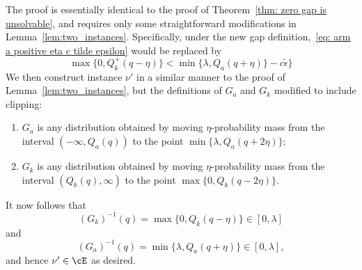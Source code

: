   The proof is essentially identical to the proof of Theorem~\ref{thm: zero gap is unsolvable}, and requires only some straightforward modifications in Lemma~\ref{lem:two_instances}. Specifically, under the new gap definition,~\eqref{eq: arm a positive eta c tilde epsilon} would be replaced by
     \begin{equation}
          \max\{0, Q^+_{k}(q - \eta)\}
       <
        \min\{\lambda, Q_{a}(q + \eta)\} - c \tilde{\epsilon}
        \Big\}
     \end{equation}
    We then construct instance $\nu'$ in a similar manner to the proof of Lemma~\ref{lem:two_instances}, but the definitions of $G_a$ and $G_k$ modified to include clipping:
    \begin{enumerate}[topsep=0pt, itemsep=0pt]
        \item 
        $G_a$ is any distribution obtained by moving $\eta$-probability mass from the interval $(-\infty, Q_a(q))$ to the point $\min\{\lambda, Q_{a}(q + 2\eta)\}$;
    
        \item 
        $G_k$ is any distribution obtained by moving $\eta$-probability mass from the interval $(Q_k(q), \infty)$ to the point $\max\{0, Q_{k}(q - 2\eta)\}$.    
    \end{enumerate}     
    It now follows that
     \begin{equation}
         (G_k)^{-1}(q) = \max\{0, Q_{k}(q - \eta)\} 
         \in [0, \lambda]
     \end{equation}
     and
      \begin{equation}
         (G_a)^{-1}(q) =  \min\{\lambda, Q_{a}(q + \eta)\} \in [0, \lambda],
     \end{equation}
     and hence $\nu' \in \cE$ as desired.